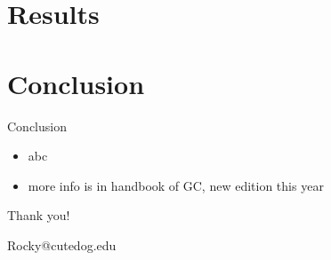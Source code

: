 \documentclass[10pt, xcolor=x11names,compress]{beamer}
\begin{document}
\section{Results}

\section{Conclusion}
\begin{frame}{Conclusion}
\begin{itemize}
    \item  abc
    \item  more info is in handbook of GC, new edition this year
\end{itemize}
    
\end{frame}


\begin{frame}
 \begin{center}
		{Thank you!}\\
		\bigskip\bigskip %
		
		{\LARGE Rocky@cutedog.edu}
		
	\end{center}
\end{frame}
\end{document}
